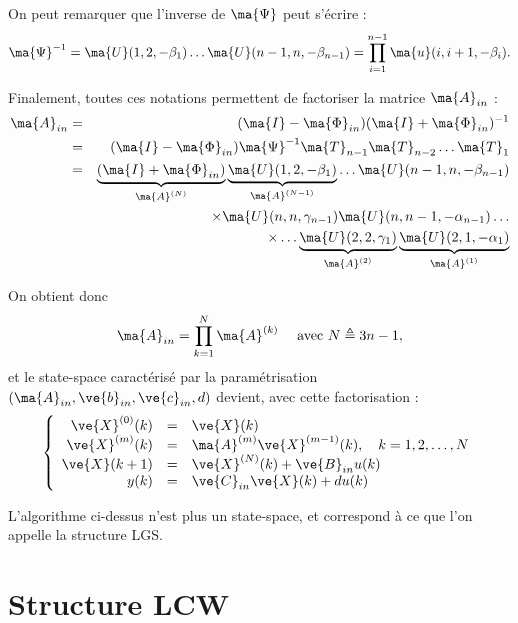 On peut remarquer que l'inverse de $\ma{\Psi}$ peut s'écrire :
\begin{equation*}
	\ma{\Psi}^{-1}=\ma{U}(1,2,-\beta_1)\ldots \ma{U}(n-1,n,-\beta_{n-1}) = \prod_{i=1}^{n-1} \ma{u}(i,i+1,-\beta_i).
\end{equation*}

Finalement, toutes ces notations permettent de factoriser la matrice $\ma{A}_{in}$ :
\begin{eqnarray}
	\ma{A}_{in}&=&(\ma{I}-\ma{\Phi}_{in})(\ma{I}+\ma{\Phi}_{in})^{-1}\nonumber\\
	  & = & (\ma{I}-\ma{\Phi}_{in})\ma{\Psi}^{-1}\ma{T}_{n-1}\ma{T}_{n-2}\ldots \ma{T}_1\nonumber\\
	  & = & \underbrace{(\ma{I}+\ma{\Phi}_{in})}_{\ma{A}^{(N)}}\underbrace{\ma{U}(1,2,-\beta_1)}_{\ma{A}^{(N-1)}}\ldots \ma{U}(n-1,n,-\beta_{n-1})\nonumber\\
	  &   & \times \ma{U}(n,n,\gamma_{n-1})\ma{U}(n,n-1,-\alpha_{n-1})\ldots \label{eq:}\\
	  &   & \times \ldots \underbrace{\ma{U}(2,2,\gamma_1)}_{\ma{A}^{(2)}}\underbrace{\ma{U}(2,1,-\alpha_1)}_{\ma{A}^{(1)}}\nonumber
\end{eqnarray}

On obtient donc
\begin{equation*}
	\ma{A}_{in} = \prod_{k=1}^{N}\ma{A}^{(k)}\quad \text{ avec }N\triangleq3n-1, 
\end{equation*}
et le state-space caractérisé par la paramétrisation $(\ma{A}_{in}, \ve{b}_{in}, \ve{c}_{in},d)$ devient, avec cette factorisation :
\begin{equation*}
\left \{
\begin{array}{rcl}
\ve{X}^{(0)}(k)&=&\ve{X}(k)\\
\ve{X}^{(m)}(k) & = & \ma{A}^{(m)}\ve{X}^{(m-1)}(k), \quad k=1,2,\ldots,N\\
\ve{X}(k+1) & = & \ve{X}^{(N)}(k)+\ve{B}_{in}u(k) \\
y(k)& = & \ve{C}_{in}\ve{X}(k)+du(k)\\
\end{array}
\right .
\end{equation*}

L'algorithme ci-dessus n'est plus un state-space, et correspond à ce que l'on appelle la structure LGS.





\section{Structure LCW\label{anx:LCW}}

